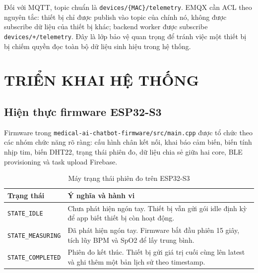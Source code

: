 \documentclass[a4paper,13pt,3p,oneside]{report}
\begin{document}
Đối với MQTT, topic chuẩn là \texttt{devices/\{MAC\}/telemetry}. EMQX cần ACL theo nguyên tắc: thiết bị chỉ được publish vào topic của chính nó, không được subscribe dữ liệu của thiết bị khác; backend worker được subscribe \texttt{devices/+/telemetry}. Đây là lớp bảo vệ quan trọng để tránh việc một thiết bị bị chiếm quyền đọc toàn bộ dữ liệu sinh hiệu trong hệ thống.
\chapter{TRIỂN KHAI HỆ THỐNG}
\section{Hiện thực firmware ESP32-S3}
Firmware trong \texttt{medical-ai-chatbot-firmware/src/main.cpp} được tổ chức theo các nhóm chức năng rõ ràng: cấu hình chân kết nối, khai báo cảm biến, biến tính nhịp tim, biến DHT22, trạng thái phiên đo, dữ liệu chia sẻ giữa hai core, BLE provisioning và task upload Firebase.

\begin{table}[H]
\centering
\caption{Máy trạng thái phiên đo trên ESP32-S3}
\begin{tabular}{p{4cm}p{10cm}}
\toprule
\textbf{Trạng thái} & \textbf{Ý nghĩa và hành vi} \\
\midrule
\texttt{STATE\_IDLE} & Chưa phát hiện ngón tay. Thiết bị vẫn gửi gói idle định kỳ để app biết thiết bị còn hoạt động. \\
\texttt{STATE\_MEASURING} & Đã phát hiện ngón tay. Firmware bắt đầu phiên 15 giây, tích lũy BPM và SpO2 để lấy trung bình. \\
\texttt{STATE\_COMPLETED} & Phiên đo kết thúc. Thiết bị gửi giá trị cuối cùng lên latest và ghi thêm một bản lịch sử theo timestamp. \\
\bottomrule
\end{tabular}
\end{table}

\begin{algorithm}[H]
\caption{Thuật toán xử lý phiên đo trên ESP32-S3}
\end{algorithm}
\end{document}
